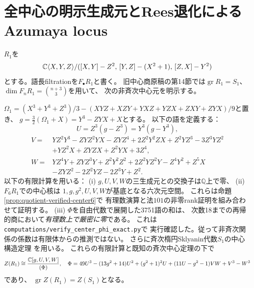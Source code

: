 \section{全中心の明示生成元とRees退化によるAzumaya locus}
\label{sec:quotient-center-azumaya}
$R_1$を
\[
 \mathbb C\langle X,Y,Z\rangle/
 ([X,Y]-Z^2,\,[Y,Z]-(X^2+1),\,[Z,X]-Y^2)
\]
とする。語長filtrationを$F_\bullet R_1$と書く。
旧中心商原稿の第14節では$\operatorname{gr}R_1=S_1$、
$\dim F_nR_1=\binom{n+3}{3}$を用いて、
次の非斉次中心元を明示する。

\begin{proposition}[四つの中心生成元と厳密有理数上の関係式]
\label{prop:quotient-full-center}
$\Omega_1=(X^3+Y^3+Z^3)/3-
 (XYZ+XZY+YXZ+YZX+ZXY+ZYX)/9$と置き、
$g=\frac32(\Omega_1+X)=Y^3-ZYX+X$とする。
以下の語を定義する：
\[
 U=Z^3(g-Z^3)=Y^3(g-Y^3),
\]
\[
\begin{aligned}
 V={}&YZ^2Y^3-ZYZ^2YX-ZYZ^4
   +2Z^2Y^2ZX+Z^2YZ^3-3Z^3YZ^2\\
  &+YZ^2X+ZYZX+Z^2YX+3Z^4,\\
 W={}&YZ^4Y+ZYZ^3Y+Z^2Y^2Z^2+2Z^2YZ^2Y
      -Z^4Y^2+Z^5X\\
  &-ZYZ^2-2Z^2YZ-2Z^3Y+Z^2 .
\end{aligned}
\]
以下の有限計算を用いる：
(i) $g,U,V,W$の三生成元との交換子は$\mathbb Q$上で零、
(ii) $F_6R_1$での中心核は
$1,g,g^2,U,V,W$が基底となる六次元空間。
これらは命題\ref{prop:quotient-verified-center6}で
有理数演算と法$101$の非零rank証明を組み合わせて証明する。
(iii) $\Phi$を自由代数で展開した3751語の和は、
次数18までの再帰的商において\emph{有理数上で厳密に零}である。
これは\texttt{computations/verify\_center\_phi\_exact.py}で
実行確認した。従って非斉次関係の係数は有限体からの推測ではない。
さらに斉次楕円Sklyanin代数$S_1$の中心構造定理
\cite{WWYSklyanin}を用いる。
これらの有限計算と既知の斉次中心定理の下で
\[
 Z(R_1)\cong
 \frac{\mathbb C[g,U,V,W]}{(\Phi)},\quad
 \Phi=49U^3-(13g^2+14)U^2+(g^2+1)^2U
 +(11U-g^2-1)VW+V^3-W^3
\]
であり、
$\operatorname{gr}Z(R_1)=Z(S_1)$となる。
\end{proposition}
